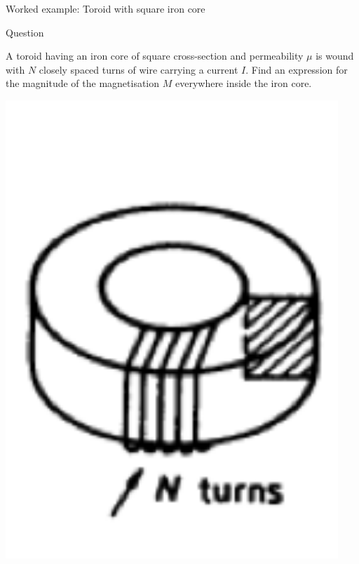 {
\problemslide

%
%
%

\begin{frame}{Worked example: Toroid with square iron core}

  \begin{blockexmplque}{Question}
    \begin{minipage}[r]{0.82\textwidth}
      A toroid having an iron core of square cross-section and permeability $\mu$
      is wound with $N$ closely spaced turns of wire carrying a current $I$.
      Find an expression for the magnitude of the magnetisation $M$ everywhere
      inside the iron core.
    \end{minipage}
    \begin{minipage}[l]{0.15\textwidth}
     \begin{center}
       \includegraphics[width=0.94\textwidth]{./images/problems/lect07_toroid_with_square_iron_core}
     \end{center}
    \end{minipage}
  \end{blockexmplque}


\end{frame}}
